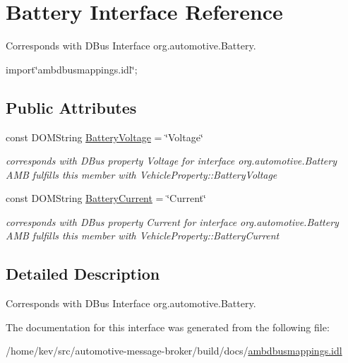 \hypertarget{interfaceBattery}{\section{Battery Interface Reference}
\label{interfaceBattery}
}


Corresponds with D\+Bus Interface org.\+automotive.\+Battery.  




{\ttfamily import\char`\"{}ambdbusmappings.\+idl\char`\"{};}

\subsection*{Public Attributes}
\begin{DoxyCompactItemize}
\item 
\hypertarget{interfaceBattery_a2456b1f2d089f79ba7d9c2ed8f5e43fd}{const D\+O\+M\+String \hyperlink{interfaceBattery_a2456b1f2d089f79ba7d9c2ed8f5e43fd}{Battery\+Voltage} = \char`\"{}Voltage\char`\"{}}\label{interfaceBattery_a2456b1f2d089f79ba7d9c2ed8f5e43fd}

\begin{DoxyCompactList}\small\item\em corresponds with D\+Bus property Voltage for interface org.\+automotive.\+Battery A\+M\+B fulfills this member with Vehicle\+Property\+::\+Battery\+Voltage \end{DoxyCompactList}\item 
\hypertarget{interfaceBattery_a7917b13d651f01d4c746404a3db3ae11}{const D\+O\+M\+String \hyperlink{interfaceBattery_a7917b13d651f01d4c746404a3db3ae11}{Battery\+Current} = \char`\"{}Current\char`\"{}}\label{interfaceBattery_a7917b13d651f01d4c746404a3db3ae11}

\begin{DoxyCompactList}\small\item\em corresponds with D\+Bus property Current for interface org.\+automotive.\+Battery A\+M\+B fulfills this member with Vehicle\+Property\+::\+Battery\+Current \end{DoxyCompactList}\end{DoxyCompactItemize}


\subsection{Detailed Description}
Corresponds with D\+Bus Interface org.\+automotive.\+Battery. 

The documentation for this interface was generated from the following file\+:\begin{DoxyCompactItemize}
\item 
/home/kev/src/automotive-\/message-\/broker/build/docs/\hyperlink{ambdbusmappings_8idl}{ambdbusmappings.\+idl}\end{DoxyCompactItemize}
